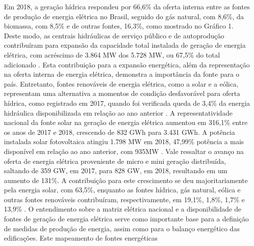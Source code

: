 \begin{onehalfspace}
    \noindent Em 2018, a geração hídrica respondeu por 66,6\% da oferta interna entre as fontes de
    produção de energia elétrica no Brasil, seguido do gás natural, com 8,6\%, da biomassa, 
    com 8,5\% e de outras fontes, 16,3\%, como mostrado no Gráfico 1. Deste modo, 
    as centrais hidráulicas de serviço público e de autoprodução contribuíram para expansão 
    da capacidade total instalada de geração de energia elétrica, com acréscimo de 3.864 MW 
    dos 5.728 MW, ou 67,5\% do total adicionado \cite{EmpresadePesquisaEnergetica-EPE2019}.\vspace*{0.3cm} \newline
    \noindent Esta contribuição para a expansão energética, além da representação na oferta interna de 
    energia elétrica, demonstra a importância da fonte para o país. Entretanto, fontes renováveis 
    de energia elétrica, como a solar e a eólica, representam uma alternativa a momentos de 
    condição desfavorável para oferta hídrica, como registrado em 2017, quando foi verificada 
    queda de 3,4\% da energia hidráulica disponibilizada em relação ao ano anterior \cite{EmpresadePesquisaEnergetica-EPE2018}.\vspace*{0.3cm} \newline
    A representatividade nacional da fonte solar na geração de energia elétrica aumentou em 316,1\% 
    entre os anos de 2017 e 2018, crescendo de 832 GWh para 3.431 GWh. A potência instalada solar 
    fotovoltaica atingiu 1.798 MW em 2018, 47,99\% potência a mais disponível em relação ao ano 
    anterior, com 935MW \cite{EmpresadePesquisaEnergetica-EPE2019,EmpresadePesquisaEnergetica-EPE2019a}.\vspace{0.3cm} \newline
    Vale ressaltar o avanço na oferta de energia elétrica proveniente de micro e mini geração 
    distribuída, saltando de 359 GW, em 2017, para 828 GW, em 2018, resultando em um aumento de 131\%. 
    A contribuição para este crescimento se deu majoritariamente pela energia solar, com 63,5\%, 
    enquanto as fontes hídrica, gás natural, eólica e outras fontes renováveis contribuíram, respectivamente, 
    em 19,1\%, 1,8\%, 1,7\% e 13,9\% \cite{EmpresadePesquisaEnergetica-EPE2019}.\vspace{0.3cm} \newline
    O entendimento sobre a matriz elétrica nacional e a disponibilidade de fontes de geração de 
    energia elétrica serve como importante base para a definição de medidas de produção de energia, 
    assim como para o balanço energético das edificações. Este mapeamento de fontes energéticas 

\end{onehalfspace}
